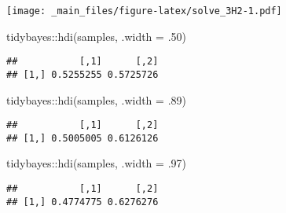 \documentclass[
]{book}
\newenvironment{Shaded}{\begin{snugshade}}{\end{snugshade}}
\newcommand{\AttributeTok}[1]{\textcolor[rgb]{0.77,0.63,0.00}{#1}}
\newcommand{\ConstantTok}[1]{\textcolor[rgb]{0.00,0.00,0.00}{#1}}
\newcommand{\DecValTok}[1]{\textcolor[rgb]{0.00,0.00,0.81}{#1}}
\newcommand{\FloatTok}[1]{\textcolor[rgb]{0.00,0.00,0.81}{#1}}
\newcommand{\FunctionTok}[1]{\textcolor[rgb]{0.00,0.00,0.00}{#1}}
\newcommand{\NormalTok}[1]{#1}
\newcommand{\OtherTok}[1]{\textcolor[rgb]{0.56,0.35,0.01}{#1}}
\newcommand{\SpecialCharTok}[1]{\textcolor[rgb]{0.00,0.00,0.00}{#1}}
\begin{document}
\begin{Shaded}
\end{Shaded}

\texttt{[image: \_main\_files/figure-latex/solve\_3H2-1.pdf]}

\begin{Shaded}
\begin{Highlighting}[]
\NormalTok{tidybayes}\SpecialCharTok{::}\FunctionTok{hdi}\NormalTok{(samples, }\AttributeTok{.width =}\NormalTok{ .}\DecValTok{50}\NormalTok{)}
\end{Highlighting}
\end{Shaded}

\begin{verbatim}
##           [,1]      [,2]
## [1,] 0.5255255 0.5725726
\end{verbatim}

\begin{Shaded}
\begin{Highlighting}[]
\NormalTok{tidybayes}\SpecialCharTok{::}\FunctionTok{hdi}\NormalTok{(samples, }\AttributeTok{.width =}\NormalTok{ .}\DecValTok{89}\NormalTok{)}
\end{Highlighting}
\end{Shaded}

\begin{verbatim}
##           [,1]      [,2]
## [1,] 0.5005005 0.6126126
\end{verbatim}

\begin{Shaded}
\begin{Highlighting}[]
\NormalTok{tidybayes}\SpecialCharTok{::}\FunctionTok{hdi}\NormalTok{(samples, }\AttributeTok{.width =}\NormalTok{ .}\DecValTok{97}\NormalTok{)}
\end{Highlighting}
\end{Shaded}

\begin{verbatim}
##           [,1]      [,2]
## [1,] 0.4774775 0.6276276
\end{verbatim}
\end{document}
